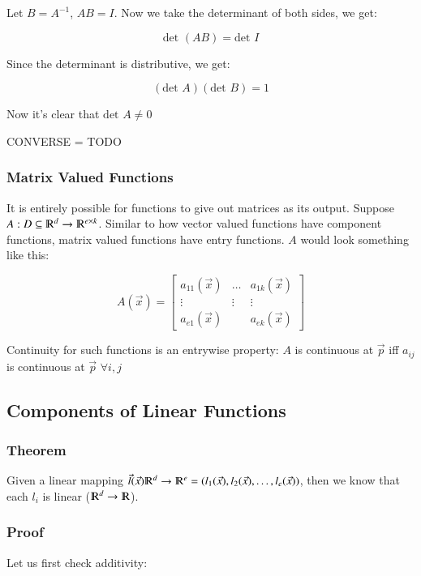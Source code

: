 \documentclass [12 pt, twoside] {book}
\newcommand\+{\text{ }}
\newcommand{\det}{\text{det }}
\begin{document}
Let $B = A^{-1}$, $AB = I$. Now we take the determinant of both sides, we get:

$$\det (AB) = \det I$$

Since the determinant is distributive, we get:

$$(\det A)(\det B) = 1$$

Now it's clear that $\det A \neq 0$

CONVERSE = TODO

\subsubsection{Matrix Valued Functions}

It is entirely possible for functions to give out matrices as its output.
Suppose $A : D \subseteq \varmathbb{R}^d \to \varmathbb{R}^{e \times k}$.
Similar to how vector valued functions have component functions, matrix valued
functions have entry functions. $A$ would look something like this:

\[
    A(\vec{x}) = \left[\begin{array}{ccc}
            a_{11}(\vec{x}) & \dots & a_{1k}(\vec{x})\\
            \vdots & \vdots & \vdots \\
            a_{e1}(\vec{x}) & & a_{ek}(\vec{x})
    \end{array}\right]
\]

Continuity for such functions is an entrywise property: $A$ is continuous at
$\vec{p}$ iff $a_{ij}$ is continuous at $\vec{p}$ $\forall i, j$

\subsection{Components of Linear Functions}
\subsubsection{Theorem}

Given a linear mapping $\vec{l}(\vec{x}) \varmathbb{R}^d \to \varmathbb{R}^e = (l_1(\vec{x}), l_2(\vec{x}),
\dots, l_e(\vec{x}))$, then we know that each $l_i$ is linear ($\varmathbb{R}^d
\to \varmathbb{R}$).

\subsubsection{Proof}

Let us first check additivity:
\end{document}
